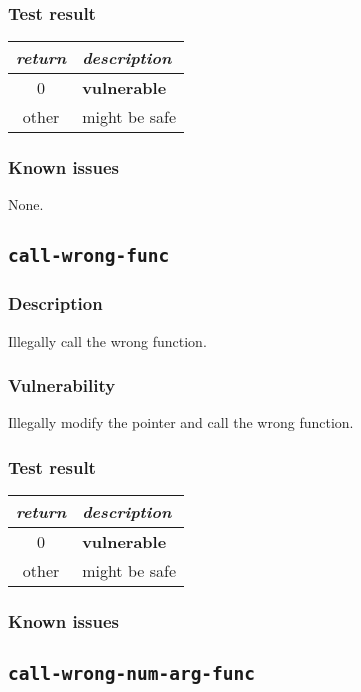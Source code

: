 \documentclass[a4paper]{book}
\begin{document}
\subsubsection{Test result}
\begin{tabular}{cl}
  \toprule
  \emph{return}  & \emph{description} \\
  \midrule
  0              & \textbf{vulnerable} \\
  other          & might be safe \\
  \bottomrule
\end{tabular}
  
\subsubsection{Known issues}

None.

\newpage

\subsection{\texttt{call-wrong-func}}\label{test-call-wrong-func}

\subsubsection{Description}
Illegally call the wrong function.
\subsubsection{Vulnerability}
Illegally modify the pointer and call the wrong function. 

\subsubsection{Test result}
\begin{tabular}{cl}
  \toprule
  \emph{return}  & \emph{description} \\
  \midrule
  0              & \textbf{vulnerable} \\
  other          & might be safe \\
  \bottomrule
\end{tabular}
  
\subsubsection{Known issues}

\newpage
\subsection{\texttt{call-wrong-num-arg-func}}\label{test-call-wrong-num-arg-func}
\end{document}
